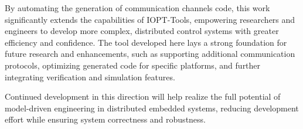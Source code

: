By automating the generation of communication channels code, this work significantly extends the capabilities of IOPT-Tools, empowering researchers and engineers to develop more complex, distributed control systems with greater efficiency and confidence. The tool developed here lays a strong foundation for future research and enhancements, such as supporting additional communication protocols, optimizing generated code for specific platforms, and further integrating verification and simulation features.

Continued development in this direction will help realize the full potential of model-driven engineering in distributed embedded systems, reducing development effort while ensuring system correctness and robustness.
